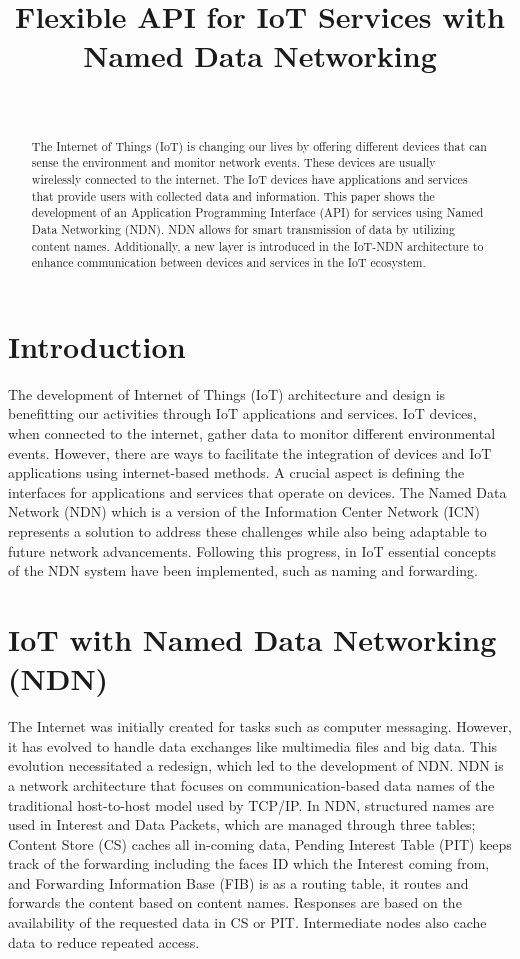 \documentclass[10pt, twocolumn, journal]{IEEEtran}
\title{Flexible API for IoT Services with Named Data Networking}
\author{
    \IEEEauthorblockN{Christopher Horn}\\
    \IEEEauthorblockA{
        University of Lübeck, Germany\\
        christopher.horn@student.uni-luebeck.de
    }
}
\begin{document}
\maketitle
\thispagestyle{empty}
\begin{abstract}
The Internet of Things (IoT) is changing our lives by offering different devices that can sense the environment and monitor network events. These devices are usually wirelessly connected to the internet. The IoT devices have applications and services that provide users with collected data and information. This paper shows the development of an Application Programming Interface (API) for services using Named Data Networking (NDN). NDN allows for smart transmission of data by utilizing content names. Additionally, a new layer is introduced in the IoT-NDN architecture to enhance communication between devices and services in the IoT ecosystem. 
\end{abstract}

\section{Introduction}
The development of Internet of Things (IoT) architecture and design is benefitting our activities through IoT applications and services. IoT devices, when connected to the internet, gather data to monitor different environmental events. However, there are ways to facilitate the integration of devices and IoT applications using internet-based methods. A crucial aspect is defining the interfaces for applications and services that operate on devices. The Named Data Network (NDN) which is a version of the Information Center Network (ICN) \cite{ahlgren2012survey} represents a solution to address these challenges \cite{zhang2010named} while also being adaptable to future network advancements. Following this progress, in IoT essential concepts of the NDN system have been implemented, such as naming and forwarding.

\section{IoT with Named Data Networking (NDN)}
The Internet was initially created for tasks such as computer messaging. However, it has evolved to handle data exchanges like multimedia files and big data. This evolution necessitated a redesign, which led to the development of NDN. NDN is a network architecture that focuses on communication-based data names of the traditional host-to-host model used by TCP/IP. In NDN, structured names are used in Interest and Data Packets, which are managed through three tables; Content Store (CS) caches all in-coming data, Pending Interest Table (PIT) keeps track of the forwarding including the faces ID which the Interest coming from, and Forwarding Information Base (FIB) is as a routing table, it routes and forwards the content based on content names. Responses are based on the availability of the requested data in CS or PIT. Intermediate nodes also cache data to reduce repeated access.
\end{document}
